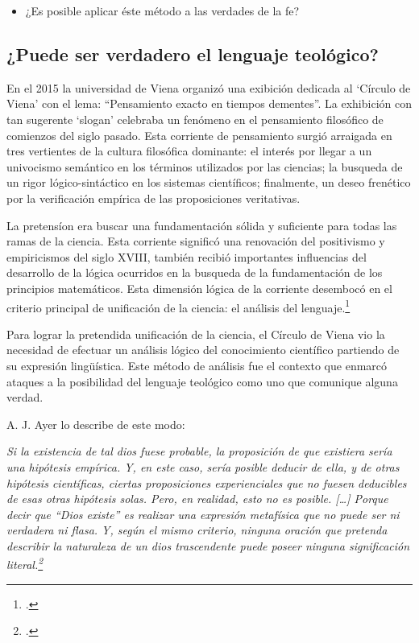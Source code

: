 \documentclass[10pt]{article}
\newcommand{\citalitlar}[1]{
\begin{adjustwidth}{1.2cm}{}
\emph{#1}
\end{adjustwidth}
}
\begin{document}
  \begin{itemize}
  \item ¿Es posible aplicar éste método a las verdades de la fe?
  \end{itemize}

\subsection{¿Puede ser verdadero el lenguaje teológico?}
En el 2015 la universidad de Viena organizó una exibición dedicada al `Círculo
de Viena' con el lema: ``Pensamiento exacto en tiempos dementes''. La exhibición
con tan sugerente `slogan' celebraba un fenómeno en el pensamiento filosófico de
comienzos del siglo pasado. Esta corriente de pensamiento surgió arraigada en
tres vertientes de la cultura filosófica dominante: el interés por llegar a un
univocismo semántico en los términos utilizados por las ciencias; la busqueda de
un rigor lógico-sintáctico en los sistemas científicos; finalmente, un deseo
frenético por la verificación empírica de las proposiciones veritativas.

La pretensíon era buscar una fundamentación sólida y suficiente para todas las
ramas de la ciencia. Esta corriente significó una renovación del positivismo y
empiricismos del siglo XVIII, también recibió importantes influencias del
desarrollo de la lógica ocurridos en la busqueda de la fundamentación de los
principios matemáticos. Esta dimensión lógica de la corriente desembocó en el
criterio principal de unificación de la ciencia: el análisis del
lenguaje.\footcite{anteo}

Para lograr la pretendida unificación de la ciencia, el Círculo de Viena vio la
necesidad de efectuar un análisis lógico del conocimiento científico partiendo
de su expresión lingüística. Este método de análisis fue el contexto que enmarcó
ataques a la posibilidad del lenguaje teológico como uno que comunique alguna
verdad.

A. J. Ayer lo describe de este modo: 
\citalitlar{Si la existencia de tal dios fuese probable, la proposición de que
  existiera sería una hipótesis empírica. Y, en este caso, sería posible deducir
  de ella, y de otras hipótesis científicas, ciertas proposiciones
  experienciales que no fuesen deducibles de esas otras hipótesis solas. Pero,
  en realidad, esto no es posible. [\ldots] Porque decir que ``Dios existe'' es
  realizar una expresión metafísica que no puede ser ni verdadera ni flasa. Y,
  según el mismo criterio, ninguna oración que pretenda describir la naturaleza
  de un dios trascendente puede poseer ninguna significación
  literal.\footcite{ayer}}
\end{document}
